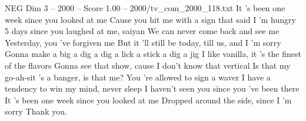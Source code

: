 \begin{textsample}{NEG Dim 3 – 2000 – Score 1.00 – 2000/tv\_com\_2000\_118.txt}  \label{ex:f3_neg_008}
It 's been one week since you looked at me Cause you hit me with a sign that said I 'm hungry 5 days since you laughed at me, saiyan We can never come back and see me Yesterday, you 've forgiven me But it 'll still be today, till us, and I 'm sorry Gonna make a big a dig a dig a lick a stick a dig a jig I like vanilla, it 's the finest of the flavors Gonna see that show, cause I don't know that vertical Is that my go-ah-sit 's a banger, is that me?
You 're allowed to sign a waver I have a tendency to win my mind, never sleep I haven't seen you since you 've been there It 's been one week since you looked at me Dropped around the side, since I 'm sorry Thank you.

\end{textsample}
